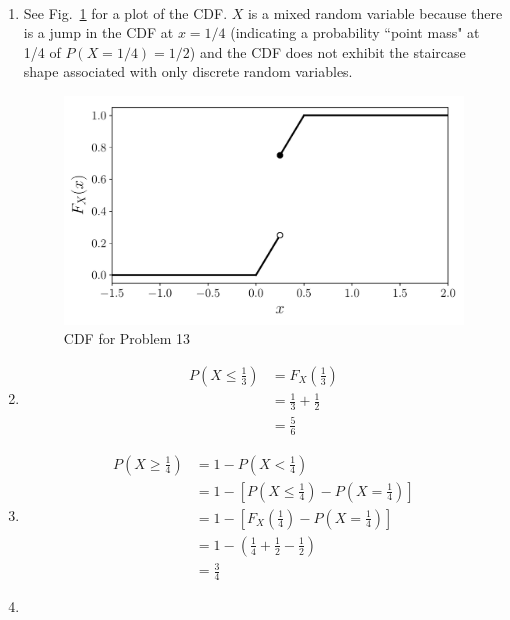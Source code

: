 \begin{problem}{13} $ $
\begin{enumerate}
\item See Fig.~\ref{fig:prob_13} for a plot of the CDF.  $X$ is a mixed random variable because there is a jump in the CDF at $x=1/4$ (indicating a probability ``point mass" at 1/4 of $P(X=1/4)=1/2$) and the CDF does not exhibit the staircase shape associated with only discrete random variables.

	\begin{figure}[t]
	\centering
      		 \includegraphics[totalheight=6cm]{chpt4/prob13.pdf}
  			  \caption{CDF for Problem 13}
    			   \label{fig:prob_13}
	\end{figure}

\item
\begin{align*}
P\left(X \le \frac{1}{3}\right) &= F_X\left(\frac{1}{3}\right) \\
&= \frac{1}{3} +\frac{1}{2}  \\
&= \frac{5}{6}
\end{align*}

\item 
\begin{align*}
P\left(X \ge \frac{1}{4}\right) &= 1 - P\left(X<\frac{1}{4}\right) \\
& = 1-\left[P\left(X \le \frac{1}{4}\right)-P\left(X=\frac{1}{4}\right)\right] \\
& = 1-\left[F_X\left(\frac{1}{4}\right)-P\left(X=\frac{1}{4}\right)\right] \\
& = 1-\left(\frac{1}{4}+\frac{1}{2}-\frac{1}{2}\right) \\
& = \frac{3}{4}
\end{align*}

\item


\end{enumerate}
\end{problem}
